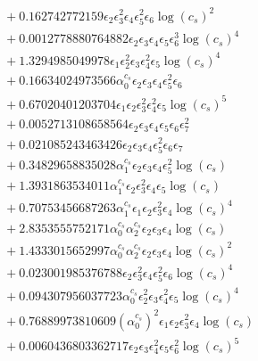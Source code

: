 \documentclass[10pt]{article}
\begin{document}
\begin{align*}
&{}  + 0.162742772159 \epsilon_{2} \epsilon_{3}^{2} \epsilon_{4} \epsilon_{5}^{2} \epsilon_{6} \log{\left(c_{s} \right)}^{2} \\
&{}  + 0.0012778880764882 \epsilon_{2} \epsilon_{3} \epsilon_{4} \epsilon_{5} \epsilon_{6}^{3} \log{\left(c_{s} \right)}^{4} \\
&{}  + 1.3294985049978 \epsilon_{1} \epsilon_{2}^{2} \epsilon_{3} \epsilon_{4}^{2} \epsilon_{5} \log{\left(c_{s} \right)}^{4} \\
&{}  + 0.16634024973566 \alpha_{0}^{c_s} \epsilon_{2} \epsilon_{3} \epsilon_{4} \epsilon_{5}^{2} \epsilon_{6} \\
&{}  + 0.67020401203704 \epsilon_{1} \epsilon_{2} \epsilon_{3}^{2} \epsilon_{4}^{2} \epsilon_{5} \log{\left(c_{s} \right)}^{5} \\
&{}  + 0.0052713108658564 \epsilon_{2} \epsilon_{3} \epsilon_{4} \epsilon_{5} \epsilon_{6} \epsilon_{7}^{2} \\
&{}  + 0.021085243463426 \epsilon_{2} \epsilon_{3} \epsilon_{4} \epsilon_{5}^{2} \epsilon_{6} \epsilon_{7} \\
&{}  + 0.34829658835028 \alpha_{1}^{c_s} \epsilon_{2} \epsilon_{3} \epsilon_{4} \epsilon_{5}^{2} \log{\left(c_{s} \right)} \\
&{}  + 1.3931863534011 \alpha_{1}^{c_s} \epsilon_{2} \epsilon_{3}^{2} \epsilon_{4} \epsilon_{5} \log{\left(c_{s} \right)} \\
&{}  + 0.70753456687263 \alpha_{1}^{c_s} \epsilon_{1} \epsilon_{2} \epsilon_{3}^{2} \epsilon_{4} \log{\left(c_{s} \right)}^{4} \\
&{}  + 2.8353555752171 \alpha_{0}^{c_s} \alpha_{2}^{c_s} \epsilon_{2} \epsilon_{3} \epsilon_{4} \log{\left(c_{s} \right)} \\
&{}  + 1.4333015652997 \alpha_{0}^{c_s} \alpha_{2}^{c_s} \epsilon_{2} \epsilon_{3} \epsilon_{4} \log{\left(c_{s} \right)}^{2} \\
&{}  + 0.023001985376788 \epsilon_{2} \epsilon_{3}^{2} \epsilon_{4} \epsilon_{5}^{2} \epsilon_{6} \log{\left(c_{s} \right)}^{4} \\
&{}  + 0.094307956037723 \alpha_{0}^{c_s} \epsilon_{2}^{2} \epsilon_{3} \epsilon_{4}^{2} \epsilon_{5} \log{\left(c_{s} \right)}^{4} \\
&{}  + 0.76889973810609 \left(\alpha_{0}^{c_s}\right)^{2} \epsilon_{1} \epsilon_{2} \epsilon_{3}^{2} \epsilon_{4} \log{\left(c_{s} \right)} \\
&{}  + 0.0060436803362717 \epsilon_{2} \epsilon_{3} \epsilon_{4}^{2} \epsilon_{5} \epsilon_{6}^{2} \log{\left(c_{s} \right)}^{5} \\

\end{align*}
\end{document}
